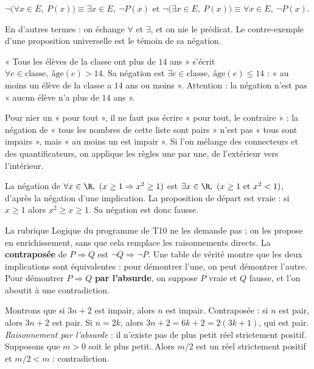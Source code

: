\begin{theorem}
$\lnot\bigl(\forall x\in E,\ P(x)\bigr)\equiv\exists x\in E,\ \lnot P(x)$ \qquad et \qquad $\lnot\bigl(\exists x\in E,\ P(x)\bigr)\equiv\forall x\in E,\ \lnot P(x)$.
\end{theorem}
En d'autres termes : on échange $\forall$ et $\exists$, et on nie le prédicat. Le contre-exemple d'une proposition universelle est le témoin de sa négation.
\begin{example}
« Tous les élèves de la classe ont plus de $14$ ans » s'écrit $\forall e\in\text{classe},\ \text{âge}(e)>14$. Sa négation est $\exists e\in\text{classe},\ \text{âge}(e)\le14$ : « au moins un élève de la classe a $14$ ans ou moins ». Attention : la négation n'est pas « aucun élève n'a plus de $14$ ans ».
\end{example}
\begin{pitfall}
Pour nier un « pour tout », il ne faut pas écrire « pour tout, le contraire » : la négation de « tous les nombres de cette liste sont pairs » n'est pas « tous sont impairs », mais « au moins un est impair ». Si l'on mélange des connecteurs et des quantificateurs, on applique les règles une par une, de l'extérieur vers l'intérieur.
\end{pitfall}
\begin{example}
La négation de $\forall x\in\R,\ (x\ge1\Rightarrow x^2\ge1)$ est $\exists x\in\R,\ (x\ge1\ \text{et}\ x^2<1)$, d'après la négation d'une implication. La proposition de départ est vraie : si $x\ge1$ alors $x^2\ge x\ge1$. Sa négation est donc fausse.
\end{example}

\begin{beyond}
La rubrique Logique du programme de T10 ne les demande pas ; on les propose en enrichissement, sans que cela remplace les raisonnements directs.
La \textbf{contraposée} de $P\Rightarrow Q$ est $\lnot Q\Rightarrow\lnot P$. Une table de vérité montre que les deux implications sont équivalentes : pour démontrer l'une, on peut démontrer l'autre.
Pour démontrer $P\Rightarrow Q$ \textbf{par l'absurde}, on suppose $P$ vraie et $Q$ fausse, et l'on aboutit à une contradiction.
\begin{example}
Montrons que si $3n+2$ est impair, alors $n$ est impair. Contraposée : si $n$ est pair, alors $3n+2$ est pair. Si $n=2k$, alors $3n+2=6k+2=2(3k+1)$, qui est pair. \emph{Raisonnement par l'absurde} : il n'existe pas de plus petit réel strictement positif. Supposons que $m>0$ soit le plus petit. Alors $m/2$ est un réel strictement positif et $m/2<m$ : contradiction.
\end{example}
\end{beyond}


